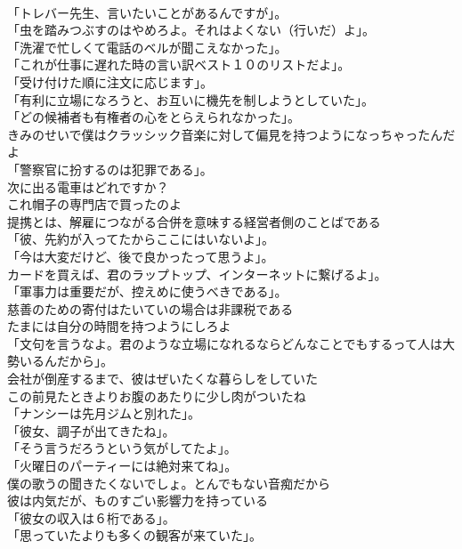 \documentclass[8pt]{extreport}
\begin{document}
\begin{CJK}{UTF8}{min}
\\	「トレバー先生、言いたいことがあるんですが」。	
\\	「虫を踏みつぶすのはやめろよ。それはよくない（行いだ）よ」。	
\\	「洗濯で忙しくて電話のベルが聞こえなかった」。	
\\	「これが仕事に遅れた時の言い訳ベスト１０のリストだよ」。	
\\	「受け付けた順に注文に応じます」。	
\\	「有利に立場になろうと、お互いに機先を制しようとしていた」。	
\\	「どの候補者も有権者の心をとらえられなかった」。	
\\	きみのせいで僕はクラッシック音楽に対して偏見を持つようになっちゃったんだよ	
\\	「警察官に扮するのは犯罪である」。	
\\	次に出る電車はどれですか？	
\\	これ帽子の専門店で買ったのよ	
\\	提携とは、解雇につながる合併を意味する経営者側のことばである	
\\	「彼、先約が入ってたからここにはいないよ」。	
\\	「今は大変だけど、後で良かったって思うよ」。	
\\	カードを買えば、君のラップトップ、インターネットに繋げるよ」。	
\\	「軍事力は重要だが、控えめに使うべきである」。	
\\	慈善のための寄付はたいていの場合は非課税である	
\\	たまには自分の時間を持つようにしろよ	
\\	「文句を言うなよ。君のような立場になれるならどんなことでもするって人は大勢いるんだから」。	
\\	会社が倒産するまで、彼はぜいたくな暮らしをしていた	
\\	この前見たときよりお腹のあたりに少し肉がついたね	
\\	「ナンシーは先月ジムと別れた」。	
\\	「彼女、調子が出てきたね」。	
\\	「そう言うだろうという気がしてたよ」。	
\\	「火曜日のパーティーには絶対来てね」。	
\\	僕の歌うの聞きたくないでしょ。とんでもない音痴だから	
\\	彼は内気だが、ものすごい影響力を持っている	
\\	「彼女の収入は６桁である」。	
\\	「思っていたよりも多くの観客が来ていた」。	

\end{CJK}
\end{document}

